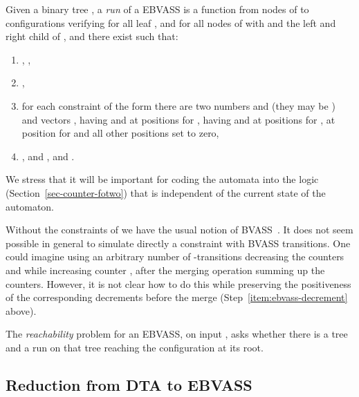 \documentclass{CSML}
\newcommand\bvass{\textup{BVASS}\xspace}
\newcommand\ebvass{\textup{EBVASS}\xspace}
\newcommand\dad{\textup{DTA}\xspace}
\begin{document}
Given a binary tree , a \emph{run}  of a \ebvass is a
function from nodes of  to configurations verifying for all leaf ,
 and for all nodes  of  with  and
 the left and right child of , and  there exist 
such that:

\begin{enumerate}
\item , 
,
\item ,
\item for each constraint  of the form  
there are two numbers  and  (they may be )
and vectors , having
 and  at positions  for , having
 and  at positions  for ,
 at position  for 
and all other positions set to zero,
\item \label{item:ebvass-decrement}
      , and 
      , and
. 
\end{enumerate}
\noindent
We stress that it will be important for coding the automata into the logic
(Section~\ref{sec-counter-fotwo}) that  is independent of the current state of the automaton.

Without the constraints of  we have the usual notion of
\bvass~\cite{acl10}. 
It does not seem possible in general to simulate directly a constraint
 with BVASS transitions.  One could imagine using an
arbitrary number of -transitions decreasing the counters  and
 while increasing counter , after the merging operation summing up the
counters.  However, it is not clear how to do this while preserving the
positiveness of the corresponding decrements before the merge
(Step~\ref{item:ebvass-decrement} above).


\medskip

\noindent
The \emph{reachability} problem for an \ebvass, on input , 
asks whether there is a tree and a run on that tree reaching 
the configuration  at its root.


\subsection{Reduction from \texorpdfstring{\dad}{DTA} to \texorpdfstring{\ebvass}{EBVASS}}
\end{document}
